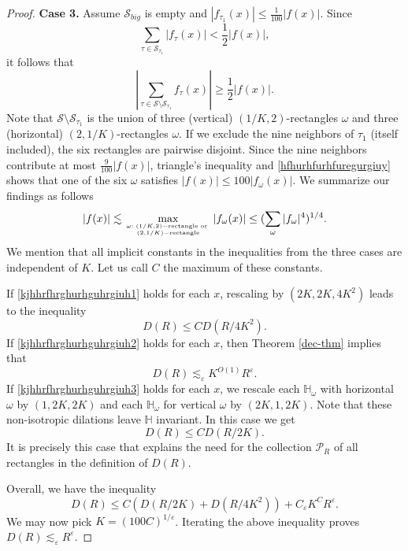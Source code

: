 \documentclass{amsart}%
\numberwithin{equation}{section}
\newcommand{\e}{\varepsilon}
\newcommand{\ZH}{\mathbb{H}}
\newcommand{\1}{\mathbbm{1}}
\begin{document}
\begin{proof}
    {\bf Case 3.} Assume $\mathcal{S}_{big}$ is empty and $|f_{\tau_1}(x)|\le \frac1{100}|f(x)|$. Since 
    $$\sum_{\tau\in\mathcal{S}_{\tau_1}}|f_\tau(x)|<\frac12|f(x)|,$$
    it follows that 
    \begin{equation}
    \label{hfhurhfurhfuregurgiuy}
    |\sum_{\tau\in \mathcal{S}\setminus\mathcal{S}_{\tau_1}}f_\tau(x)|\ge \frac12|f(x)|.
    \end{equation}
    Note that $\mathcal{S}\setminus\mathcal{S}_{\tau_1}$ is the union of three (vertical) $(1/K,2)$-rectangles $\omega$ and three (horizontal) $(2,1/K)$-rectangles $\omega$. If we exclude the nine neighbors of $\tau_1$ (itself included), the six rectangles are pairwise disjoint. Since the nine neighbors contribute at most $\frac{9}{100}|f(x)|$, triangle's inequality and \eqref{hfhurhfurhfuregurgiuy} shows that one of the six $\omega$ satisfies
    $|f(x)|\le 100|f_\omega(x)|.$ We summarize our findings as follows
    \begin{equation}
    \label{kjhhrfhrghurhguhrgiuh3}
    |f(x)|\lesssim \max_{\omega:\;(1/K,2)-\text{rectangle or }\atop{(2,1/K)-\text{rectangle}}}|f_\omega(x)|\le (\sum_{\omega}|f_\omega|^4)^{1/4}.
    \end{equation}
    We mention that all implicit constants in the inequalities from the three cases are independent of $K$. Let us call $C$ the maximum of these constants. 
    \smallskip

    
    If \eqref{kjhhrfhrghurhguhrgiuh1} holds for each $x$, rescaling by $(2K,2K,4K^2)$ leads to the inequality
    $$D(R)\le CD(R/4K^2).$$
	If \eqref{kjhhrfhrghurhguhrgiuh2} holds for each $x$, then Theorem \ref{dec-thm} implies that
    $$D(R)\lesssim_\e K^{O(1)}R^{\e}.$$
    If \eqref{kjhhrfhrghurhguhrgiuh3} holds for each $x$, we rescale each $\ZH_{\omega}$ with horizontal $\omega$ by $(1,2K,2K)$ and each $\ZH_{\omega}$ for vertical $\omega$ by $(2K,1,2K)$. Note that these non-isotropic dilations leave $\ZH$ invariant. In this case we get
    $$D(R)\le CD(R/2K).$$
   It is precisely this case that explains the need for the collection $\mathcal{P}_R$ of all rectangles in the definition of $D(R)$.

Overall, we have the inequality
$$D(R)\le C(D(R/2K)+D(R/4K^2))+C_\e K^{C}R^\e.$$
We may now pick $K=(100C)^{1/\e}$. Iterating the above inequality proves
$D(R)\lesssim_\e R^\e$. \qedhere

\end{proof}
	

    \bigskip 
	
\end{document}
